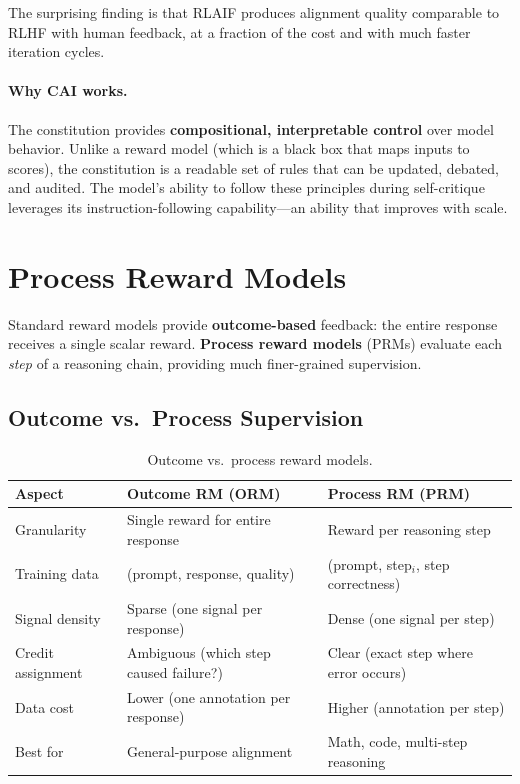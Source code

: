 The surprising finding is that RLAIF produces alignment quality comparable
to RLHF with human feedback, at a fraction of the cost and with much
faster iteration cycles.

\paragraph{Why CAI works.}
The constitution provides \textbf{compositional, interpretable control}
over model behavior.  Unlike a reward model (which is a black box that
maps inputs to scores), the constitution is a readable set of rules that
can be updated, debated, and audited.  The model's ability to follow these
principles during self-critique leverages its instruction-following
capability---an ability that improves with scale.


\section{Process Reward Models}
\label{sec:process_rm}

Standard reward models provide \textbf{outcome-based} feedback: the entire
response receives a single scalar reward.  \textbf{Process reward models}
(PRMs) evaluate each \emph{step} of a reasoning chain, providing much
finer-grained supervision.

\subsection{Outcome vs.\ Process Supervision}

\begin{table}[H]
\centering
\begin{tabularx}{\textwidth}{lXX}
\toprule
\textbf{Aspect} & \textbf{Outcome RM (ORM)} & \textbf{Process RM (PRM)} \\
\midrule
Granularity & Single reward for entire response & Reward per reasoning step \\
Training data & (prompt, response, quality) & (prompt, step$_i$, step correctness) \\
Signal density & Sparse (one signal per response) & Dense (one signal per step) \\
Credit assignment & Ambiguous (which step caused failure?) & Clear (exact step where error occurs) \\
Data cost & Lower (one annotation per response) & Higher (annotation per step) \\
Best for & General-purpose alignment & Math, code, multi-step reasoning \\
\bottomrule
\end{tabularx}
\caption{Outcome vs.\ process reward models.}
\label{tab:orm_vs_prm}
\end{table}

